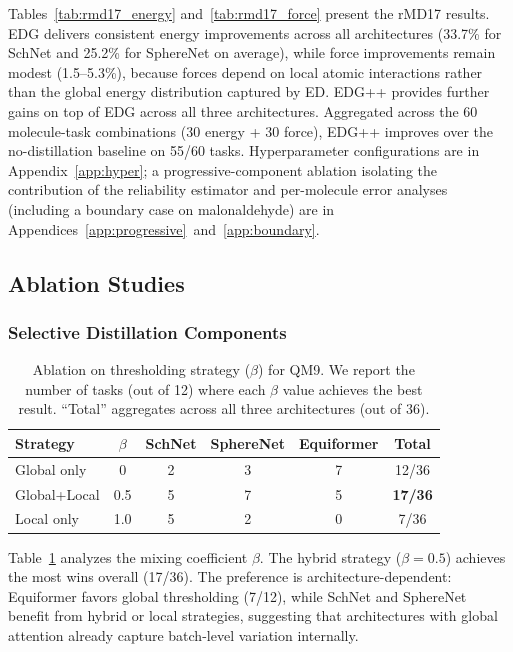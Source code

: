 Tables~\ref{tab:rmd17_energy} and~\ref{tab:rmd17_force} present the rMD17 results. EDG delivers consistent energy improvements across all architectures (33.7\% for SchNet and 25.2\% for SphereNet on average), while force improvements remain modest (1.5--5.3\%), because forces depend on local atomic interactions rather than the global energy distribution captured by ED. EDG++ provides further gains on top of EDG across all three architectures. Aggregated across the 60 molecule-task combinations (30 energy + 30 force), EDG++ improves over the no-distillation baseline on 55/60 tasks. Hyperparameter configurations are in Appendix~\ref{app:hyper}; a progressive-component ablation isolating the contribution of the reliability estimator and per-molecule error analyses (including a boundary case on malonaldehyde) are in Appendices~\ref{app:progressive}~and~\ref{app:boundary}.

\subsection{Ablation Studies}

\subsubsection{Selective Distillation Components}

\begin{table}[!t]
  \scriptsize
  \centering
  \caption{Ablation on thresholding strategy ($\beta$) for QM9. We report the number of tasks (out of 12) where each $\beta$ value achieves the best result. ``Total'' aggregates across all three architectures (out of 36).}
  \label{tab:ablation_beta}
    \begin{tabular}{lccccc}
    \toprule
    \textbf{Strategy} & \textbf{$\beta$} & \textbf{SchNet} & \textbf{SphereNet} & \textbf{Equiformer} & \textbf{Total} \\
    \midrule
    Global only & 0 & 2 & 3 & 7 & 12/36 \\
    Global+Local & 0.5 & 5 & 7 & 5 & \textbf{17/36} \\
    Local only & 1.0 & 5 & 2 & 0 & 7/36 \\
    \bottomrule
    \end{tabular}
\end{table}

Table~\ref{tab:ablation_beta} analyzes the mixing coefficient $\beta$. The hybrid strategy ($\beta=0.5$) achieves the most wins overall (17/36). The preference is architecture-dependent: Equiformer favors global thresholding (7/12), while SchNet and SphereNet benefit from hybrid or local strategies, suggesting that architectures with global attention already capture batch-level variation internally.

